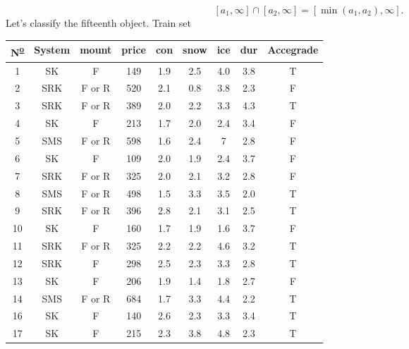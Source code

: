 \documentclass[12pt]{report}
\begin{document}
\begin{solution}
\begin{enumerate}
      \[
        [a_1, \infty] \cap [a_2, \infty] = [\min (a_1, a_2), \infty].
      \]
      Let's classify the fifteenth object. Train set
      \begin{table}[H]
        \centering
          \begin{tabular}{|c|c|c|c|c|c|c|c|c|}
          \hline
          N\textsuperscript{\underline{o}} & System & mount  & price & con & snow & ice & dur & Accegrade \\ \hline
          1  & SK     & F      & 149   & 1.9 & 2.5  & 4.0 & 3.8 & T         \\ \hline
          2  & SRK    & F or R & 520   & 2.1 & 0.8  & 3.8 & 2.3 & F         \\ \hline
          3  & SRK    & F or R & 389   & 2.0 & 2.2  & 3.3 & 4.3 & T         \\ \hline
          4  & SK     & F      & 213   & 1.7 & 2.0  & 2.4 & 3.4 & F         \\ \hline
          5  & SMS    & F or R & 598   & 1.6 & 2.4  & 7   & 2.8 & F         \\ \hline
          6  & SK     & F      & 109   & 2.0 & 1.9  & 2.4 & 3.7 & F         \\ \hline
          7  & SRK    & F or R & 325   & 2.0 & 2.1  & 3.2 & 2.8 & F         \\ \hline
          8  & SMS    & F or R & 498   & 1.5 & 3.3  & 3.5 & 2.0 & T         \\ \hline
          9  & SRK    & F or R & 396   & 2.8 & 2.1  & 3.1 & 2.5 & T         \\ \hline
          10 & SK     & F      & 160   & 1.7 & 1.9  & 1.6 & 3.7 & F         \\ \hline
          11 & SRK    & F or R & 325   & 2.2 & 2.2  & 4.6 & 3.2 & T         \\ \hline
          12 & SRK    & F      & 298   & 2.5 & 2.3  & 3.3 & 2.8 & T         \\ \hline
          13 & SK     & F      & 206   & 1.9 & 1.4  & 1.8 & 2.7 & F         \\ \hline
          14 & SMS    & F or R & 684   & 1.7 & 3.3  & 4.4 & 2.2 & T         \\ \hline
          16 & SK     & F      & 140   & 2.6 & 2.3  & 3.3 & 3.4 & T         \\ \hline
          17 & SK     & F      & 215   & 2.3 & 3.8  & 4.8 & 2.3 & T         \\ \hline
          \end{tabular}
          \end{table}


\end{enumerate}
\end{solution}
\end{document}
